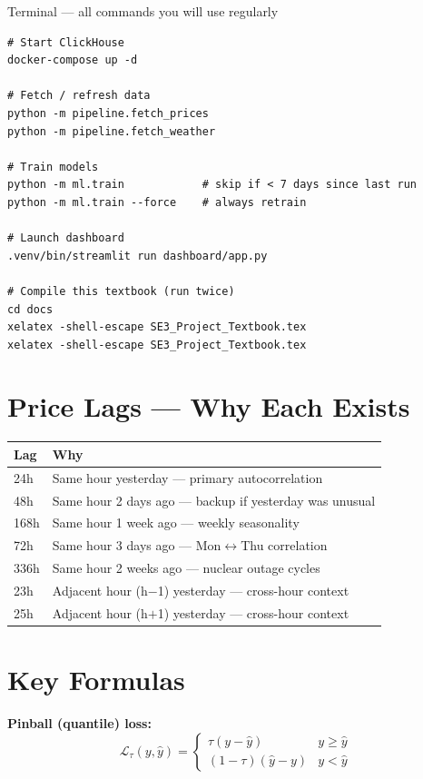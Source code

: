\documentclass[12pt, a4paper, oneside]{memoir}
\begin{document}
\begin{codefile}{Terminal --- all commands you will use regularly}
\begin{verbatim}
# Start ClickHouse
docker-compose up -d

# Fetch / refresh data
python -m pipeline.fetch_prices
python -m pipeline.fetch_weather

# Train models
python -m ml.train            # skip if < 7 days since last run
python -m ml.train --force    # always retrain

# Launch dashboard
.venv/bin/streamlit run dashboard/app.py

# Compile this textbook (run twice)
cd docs
xelatex -shell-escape SE3_Project_Textbook.tex
xelatex -shell-escape SE3_Project_Textbook.tex
\end{verbatim}
\end{codefile}

\section{Price Lags --- Why Each Exists}

\begin{center}
\begin{tabular}{ll}
\toprule
\textbf{Lag} & \textbf{Why} \\
\midrule
24h  & Same hour yesterday --- primary autocorrelation \\
48h  & Same hour 2 days ago --- backup if yesterday was unusual \\
168h & Same hour 1 week ago --- weekly seasonality \\
72h  & Same hour 3 days ago --- Mon$\leftrightarrow$Thu correlation \\
336h & Same hour 2 weeks ago --- nuclear outage cycles \\
23h  & Adjacent hour (h$-$1) yesterday --- cross-hour context \\
25h  & Adjacent hour (h$+$1) yesterday --- cross-hour context \\
\bottomrule
\end{tabular}
\end{center}

\section{Key Formulas}

\textbf{Pinball (quantile) loss:}
\[
  \mathcal{L}_\tau(y,\hat{y}) = \begin{cases}
    \tau(y-\hat{y}) & y\geq\hat{y} \\ (1-\tau)(\hat{y}-y) & y<\hat{y}
  \end{cases}
\]
\end{document}
